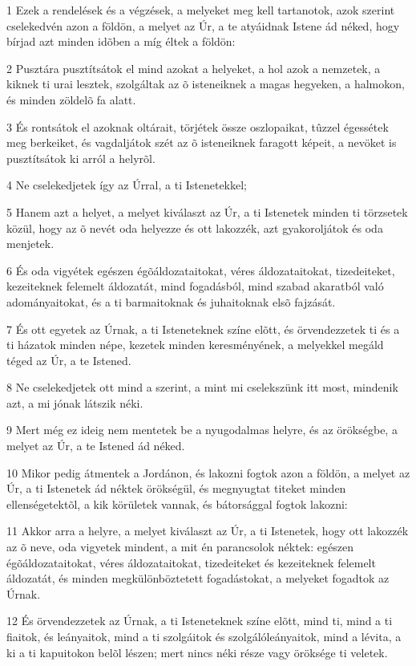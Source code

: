 \par 1 Ezek a rendelések és a végzések, a melyeket meg kell tartanotok, azok szerint cselekedvén azon a földön, a melyet az Úr, a te atyáidnak Istene ád néked, hogy bírjad azt minden idõben a míg éltek a földön:
\par 2 Pusztára pusztítsátok el mind azokat a helyeket, a hol azok a nemzetek, a kiknek ti urai lesztek, szolgáltak az õ isteneiknek a magas hegyeken, a halmokon, és minden zöldelõ fa alatt.
\par 3 És rontsátok el azoknak oltárait, törjétek össze oszlopaikat, tûzzel égessétek meg berkeiket, és vagdaljátok szét az õ isteneiknek faragott képeit, a nevöket is pusztítsátok ki arról a helyrõl.
\par 4 Ne cselekedjetek így az Úrral, a ti Istenetekkel;
\par 5 Hanem azt a helyet, a melyet kiválaszt az Úr, a ti Istenetek minden ti törzsetek közül, hogy az õ nevét oda helyezze és ott lakozzék, azt gyakoroljátok és oda menjetek.
\par 6 És oda vigyétek egészen égõáldozataitokat, véres áldozataitokat, tizedeiteket, kezeiteknek felemelt áldozatát, mind fogadásból, mind szabad akaratból való adományaitokat, és a ti barmaitoknak és juhaitoknak elsõ fajzását.
\par 7 És ott egyetek az Úrnak, a ti Isteneteknek színe elõtt, és örvendezzetek ti és a ti házatok minden népe, kezetek minden keresményének, a melyekkel megáld téged az Úr, a te Istened.
\par 8 Ne cselekedjetek ott mind a szerint, a mint mi cselekszünk itt most, mindenik azt, a mi jónak látszik néki.
\par 9 Mert még ez ideig nem mentetek be a nyugodalmas helyre, és az örökségbe, a melyet az Úr, a te Istened ád néked.
\par 10 Mikor pedig átmentek a Jordánon, és lakozni fogtok azon a földön, a melyet az Úr, a ti Istenetek ád néktek örökségül, és megnyugtat titeket minden ellenségetektõl, a kik körületek vannak, és bátorsággal fogtok lakozni:
\par 11 Akkor arra a helyre, a melyet kiválaszt az Úr, a ti Istenetek, hogy ott lakozzék az õ neve, oda vigyetek mindent, a mit én parancsolok néktek: egészen égõáldozataitokat, véres áldozataitokat, tizedeiteket és kezeiteknek felemelt áldozatát, és minden megkülönböztetett fogadástokat, a melyeket fogadtok az Úrnak.
\par 12 És örvendezzetek az Úrnak, a ti Isteneteknek színe elõtt, mind ti, mind a ti fiaitok, és leányaitok, mind a ti szolgáitok és szolgálóleányaitok, mind a lévita, a ki a ti kapuitokon belõl lészen; mert nincs néki része vagy  öröksége ti veletek.
